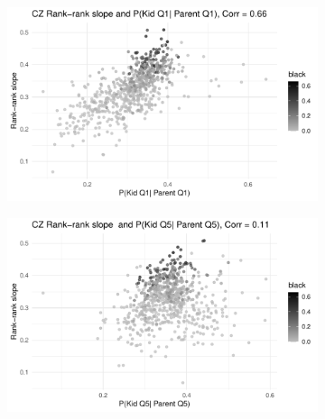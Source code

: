 \begin{figure}[htp]
     \begin{subfigure}[b]{0.4\textwidth}
         \centering
         \includegraphics[width=\textwidth]{plots/rank-rank/cz_rrs_race_q1.pdf}
     \end{subfigure} %
     \begin{subfigure}[b]{0.4\textwidth}
         \centering
         \includegraphics[width=\textwidth]{plots/rank-rank/cz_rrs_race_q5.pdf}
     \end{subfigure}
\end{figure}
